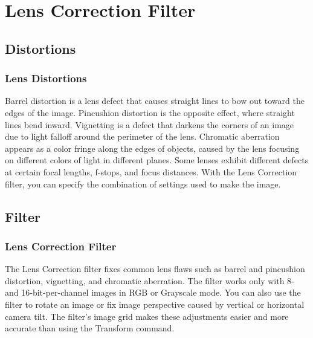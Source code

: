 \documentclass{beamer}
\begin{document}
		\section{Lens Correction Filter}
			\subsection{Distortions}		
			\begin{frame}
				\frametitle{Lens Distortions}
								\begin{outline}
					\1 Barrel distortion is a lens defect that causes straight lines to bow out toward the edges of the image.
					\1 Pincushion distortion is the opposite effect, where straight lines bend inward.
					\1 Vignetting is a defect that darkens the corners of an image due to light falloff around the perimeter of the lens. 
					\1 Chromatic aberration appears as a color fringe along the edges of objects, caused by the lens focusing on different colors of light in different planes.
					\1 Some lenses exhibit different defects at certain focal lengths, f‑stops, and focus distances. With the Lens Correction filter, you can specify the combination of settings used to make the image.
				\end{outline}
			\end{frame}
		
					\subsection{Filter}		
		\begin{frame}
			\frametitle{Lens Correction Filter}
			\begin{outline}
				\1 The Lens Correction filter fixes common lens flaws such as barrel and pincushion distortion, vignetting, and chromatic aberration. 
				\1 The filter works only with 8‑ and 16‑bit-per-channel images in RGB or Grayscale mode.
				\1 You can also use the filter to rotate an image or fix image perspective caused by vertical or horizontal camera tilt. 
				\1 The filter’s image grid makes these adjustments easier and more accurate than using the Transform command.
			\end{outline}
		\end{frame}
		
\end{document}
